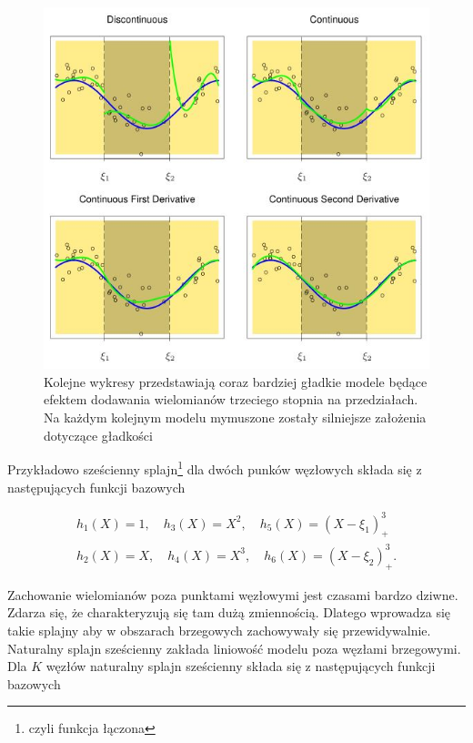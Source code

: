 \documentclass[]{book}
\let\rmarkdownfootnote\footnote%
\def\footnote{\protect\rmarkdownfootnote}
\theoremstyle{plain}
\theoremstyle{definition}
\theoremstyle{definition}
\theoremstyle{definition}
\theoremstyle{definition}
\theoremstyle{remark}
\begin{document}
\begin{figure}

{\centering \includegraphics{images/spline2} 

}

\caption{Kolejne wykresy przedstawiają coraz bardziej gładkie modele będące efektem dodawania wielomianów trzeciego stopnia na przedziałach. Na każdym kolejnym modelu mymuszone zostały silniejsze założenia dotyczące gładkości}\label{fig:spline2}
\end{figure}

Przykładowo sześcienny splajn\footnote{czyli funkcja łączona} dla dwóch punków węzłowych składa się z następujących funkcji bazowych

\begin{gather}
    h_1(X)=1,\quad h_3(X)=X^2,\quad h_5(X)=(X-\xi_1)_+^3\\
    h_2(X)=X,\quad h_4(X)=X^3,\quad h_6(X)=(X-\xi_2)_+^3.
\end{gather}

Zachowanie wielomianów poza punktami węzłowymi jest czasami bardzo dziwne. Zdarza się, że charakteryzują się tam dużą zmiennością. Dlatego wprowadza się takie splajny aby w obszarach brzegowych zachowywały się przewidywalnie.
Naturalny splajn sześcienny zakłada liniowość modelu poza węzłami brzegowymi. Dla \(K\) węzłów naturalny splajn sześcienny składa się z następujących funkcji bazowych
\end{document}
